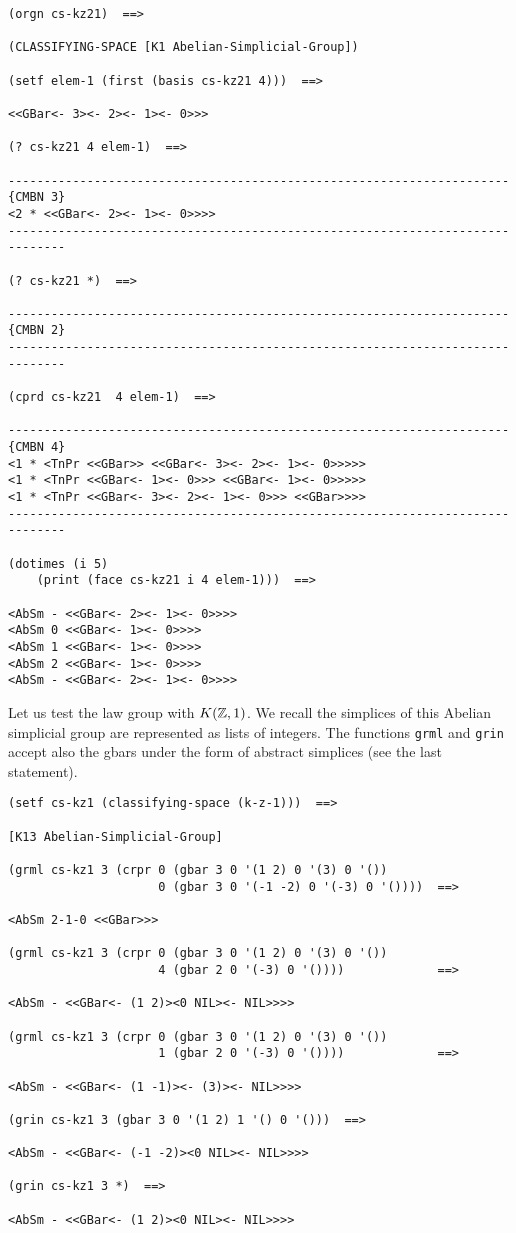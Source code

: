 \newpage
{\footnotesize\begin{verbatim}
(orgn cs-kz21)  ==>

(CLASSIFYING-SPACE [K1 Abelian-Simplicial-Group])

(setf elem-1 (first (basis cs-kz21 4)))  ==>

<<GBar<- 3><- 2><- 1><- 0>>>

(? cs-kz21 4 elem-1)  ==>

----------------------------------------------------------------------{CMBN 3}
<2 * <<GBar<- 2><- 1><- 0>>>>
------------------------------------------------------------------------------

(? cs-kz21 *)  ==>

----------------------------------------------------------------------{CMBN 2}
------------------------------------------------------------------------------

(cprd cs-kz21  4 elem-1)  ==>

----------------------------------------------------------------------{CMBN 4}
<1 * <TnPr <<GBar>> <<GBar<- 3><- 2><- 1><- 0>>>>>
<1 * <TnPr <<GBar<- 1><- 0>>> <<GBar<- 1><- 0>>>>>
<1 * <TnPr <<GBar<- 3><- 2><- 1><- 0>>> <<GBar>>>>
------------------------------------------------------------------------------

(dotimes (i 5)
    (print (face cs-kz21 i 4 elem-1)))  ==>

<AbSm - <<GBar<- 2><- 1><- 0>>>> 
<AbSm 0 <<GBar<- 1><- 0>>>> 
<AbSm 1 <<GBar<- 1><- 0>>>> 
<AbSm 2 <<GBar<- 1><- 0>>>> 
<AbSm - <<GBar<- 2><- 1><- 0>>>> 
\end{verbatim}}
Let us test the law group with $K({{\Bbb Z}}, 1)$. We recall the simplices
of  this Abelian simplicial group are represented as lists of integers.
The functions {\tt grml} and {\tt grin} accept also the gbars under the form
of abstract simplices (see the last statement).
{\footnotesize\begin{verbatim}
(setf cs-kz1 (classifying-space (k-z-1)))  ==>

[K13 Abelian-Simplicial-Group]

(grml cs-kz1 3 (crpr 0 (gbar 3 0 '(1 2) 0 '(3) 0 '())
                     0 (gbar 3 0 '(-1 -2) 0 '(-3) 0 '())))  ==>

<AbSm 2-1-0 <<GBar>>>

(grml cs-kz1 3 (crpr 0 (gbar 3 0 '(1 2) 0 '(3) 0 '())
                     4 (gbar 2 0 '(-3) 0 '())))             ==>

<AbSm - <<GBar<- (1 2)><0 NIL><- NIL>>>>

(grml cs-kz1 3 (crpr 0 (gbar 3 0 '(1 2) 0 '(3) 0 '())
                     1 (gbar 2 0 '(-3) 0 '())))             ==>

<AbSm - <<GBar<- (1 -1)><- (3)><- NIL>>>>

(grin cs-kz1 3 (gbar 3 0 '(1 2) 1 '() 0 '()))  ==>

<AbSm - <<GBar<- (-1 -2)><0 NIL><- NIL>>>>

(grin cs-kz1 3 *)  ==>

<AbSm - <<GBar<- (1 2)><0 NIL><- NIL>>>>
\end{verbatim}}
